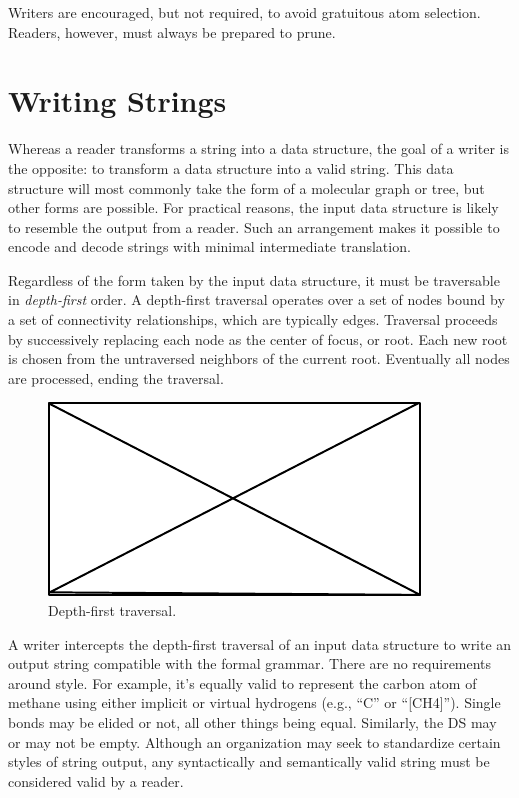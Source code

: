 \documentclass{article}
\begin{document}
Writers are encouraged, but not required, to avoid gratuitous atom selection. Readers, however, must always be prepared to prune.

\section*{Writing Strings}

Whereas a reader transforms a string into a data structure, the goal of a writer is the opposite: to transform a data structure into a valid string. This data structure will most commonly take the form of a molecular graph or tree, but other forms are possible. For practical reasons, the input data structure is likely to resemble the output from a reader. Such an arrangement makes it possible to encode and decode strings with minimal intermediate translation.

Regardless of the form taken by the input data structure, it must be traversable in \textit{depth-first} order. A depth-first traversal operates over a set of nodes bound by a set of connectivity relationships, which are typically edges. Traversal proceeds by successively replacing each node as the center of focus, or root. Each new root is chosen from the untraversed neighbors of the current root. Eventually all nodes are processed, ending the traversal.

\begin{figure}
    \centering
    \includegraphics{filler}
    \caption{Depth-first traversal.}
    \label{fig:depth-first-traversal}
\end{figure}

A writer intercepts the depth-first traversal of an input data structure to write an output string compatible with the formal grammar. There are no requirements around style. For example, it's equally valid to represent the carbon atom of methane using either implicit or virtual hydrogens (e.g., \enquote{C} or \enquote{[CH4]}). Single bonds may be elided or not, all other things being equal. Similarly, the DS may or may not be empty. Although an organization may seek to standardize certain styles of string output, any syntactically and semantically valid string must be considered valid by a reader.
\end{document}
